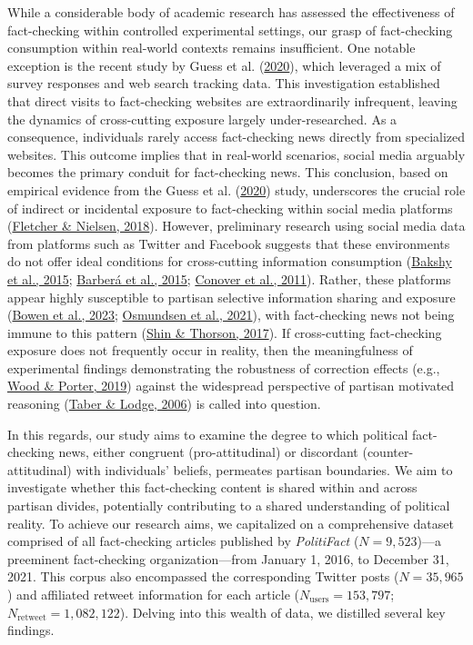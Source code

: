 \documentclass[
  12pt,
]{article}
\begin{document}
While a considerable body of academic research has assessed the
effectiveness of fact-checking within controlled experimental settings,
our grasp of fact-checking consumption within real-world contexts
remains insufficient. One notable exception is the recent study by Guess
et al. (\protect\hyperlink{ref-guess2020exposure}{2020}), which
leveraged a mix of survey responses and web search tracking data. This
investigation established that direct visits to fact-checking websites
are extraordinarily infrequent, leaving the dynamics of cross-cutting
exposure largely under-researched. As a consequence, individuals rarely
access fact-checking news directly from specialized websites. This
outcome implies that in real-world scenarios, social media arguably
becomes the primary conduit for fact-checking news. This conclusion,
based on empirical evidence from the Guess et al.
(\protect\hyperlink{ref-guess2020exposure}{2020}) study, underscores the
crucial role of indirect or incidental exposure to fact-checking within
social media platforms
(\protect\hyperlink{ref-fletcher2018people}{Fletcher \& Nielsen, 2018}).
However, preliminary research using social media data from platforms
such as Twitter and Facebook suggests that these environments do not
offer ideal conditions for cross-cutting information consumption
(\protect\hyperlink{ref-bakshy2015exposure}{Bakshy et al., 2015};
\protect\hyperlink{ref-barbera2015tweeting}{Barberá et al., 2015};
\protect\hyperlink{ref-conover2011political}{Conover et al., 2011}).
Rather, these platforms appear highly susceptible to partisan selective
information sharing and exposure
(\protect\hyperlink{ref-bowen2023learning}{Bowen et al., 2023};
\protect\hyperlink{ref-osmundsen2021partisan}{Osmundsen et al., 2021}),
with fact-checking news not being immune to this pattern
(\protect\hyperlink{ref-shin2017partisan}{Shin \& Thorson, 2017}). If
cross-cutting fact-checking exposure does not frequently occur in
reality, then the meaningfulness of experimental findings demonstrating
the robustness of correction effects (e.g.,
\protect\hyperlink{ref-wood2019elusive}{Wood \& Porter, 2019}) against
the widespread perspective of partisan motivated reasoning
(\protect\hyperlink{ref-taber2006motivated}{Taber \& Lodge, 2006}) is
called into question.

In this regards, our study aims to examine the degree to which political
fact-checking news, either congruent (pro-attitudinal) or discordant
(counter-attitudinal) with individuals' beliefs, permeates partisan
boundaries. We aim to investigate whether this fact-checking content is
shared within and across partisan divides, potentially contributing to a
shared understanding of political reality. To achieve our research aims,
we capitalized on a comprehensive dataset comprised of all fact-checking
articles published by \emph{PolitiFact} (\(N = 9,523\))---a preeminent
fact-checking organization---from January 1, 2016, to December 31, 2021.
This corpus also encompassed the corresponding Twitter posts
(\(N = 35,965\)) and affiliated retweet information for each article
(\(N_{\text{users}} = 153,797\); \(N_{\text{retweet}} = 1,082,122\)).
Delving into this wealth of data, we distilled several key findings.
\end{document}
